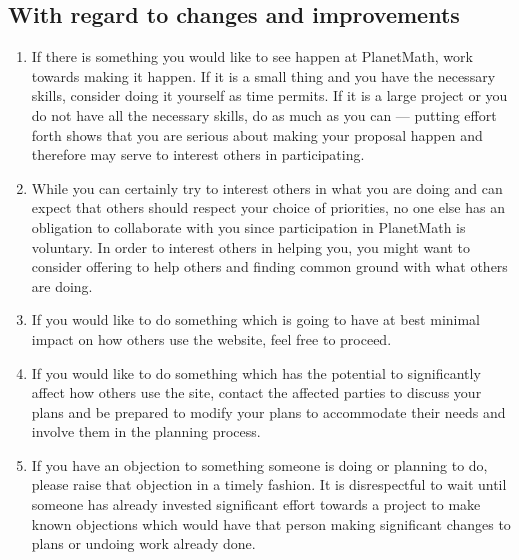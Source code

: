 \subsection*{With regard to changes and improvements}
\begin{enumerate}
\item If there is something you would like to see happen at PlanetMath, work
towards making it happen. If it is a small thing and you have the
necessary skills, consider doing it yourself as time permits. If it
is a large project or you do not have all the necessary skills, do as
much as you can --- putting effort forth shows that you are serious
about making your proposal happen and therefore may serve to
interest others in participating.
\item While you can certainly try to interest others in what you are doing
and can expect that others should respect your choice of priorities,
no one else has an obligation to collaborate with you since
participation in PlanetMath is voluntary. In order to interest
others in helping you, you might want to consider offering to help
others and finding common ground with what others are doing.
\item If you would like to do something which is going to have at best
minimal impact on how others use the website, feel free to proceed.
\item If you would like to do something which has the potential to
significantly affect how others use the site, contact the affected
parties to discuss your plans and be prepared to modify your plans to
accommodate their needs and involve them in the planning process.
\item If you have an objection to something someone is doing or planning
to do, please raise that objection in a timely fashion. It is
disrespectful to wait until someone has already invested significant
effort towards a project to make known objections which would
have that person making significant changes to plans or undoing work
already done.
\end{enumerate}
